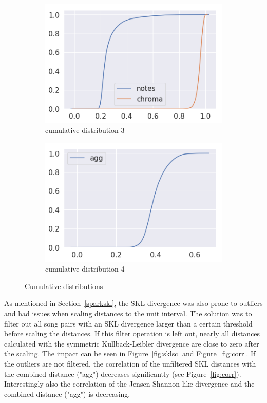 \begin{figure}[htbp]
{{			\begin{subfigure}{.495\textwidth}
				\centering     
				\includegraphics[scale=0.5]{Images/SparkFeat/cum3.png}
				\caption{cumulative distribution 3}
				\label{cum3}
			\end{subfigure}%
			\begin{subfigure}{.495\textwidth}
				\centering    
				\includegraphics[scale=0.5]{Images/SparkFeat/cum4.png}
				\caption{cumulative distribution 4}
				\label{cum4}
			\end{subfigure}	
	}}
	\caption{Cumulative distributions}
	\label{fig:cumdist}
\end{figure}
\FloatBarrier

\noindent As mentioned in Section~\ref{sparkskl}, the SKL divergence was also prone to outliers and had issues when scaling distances to the unit interval. The solution was to filter out all song pairs with an SKL divergence larger than a certain threshold before scaling the distances. If this filter operation is left out, nearly all distances calculated with the symmetric Kullback-Leibler divergence are close to zero after the scaling. The impact can be seen in Figure~\ref{fig:sklsc} and Figure~\ref{fig:corr}.
\noindent If the outliers are not filtered, the correlation of the unfiltered SKL distances with the combined distance ("agg") decreases significantly (see Figure~\ref{fig:corr}). Interestingly also the correlation of the Jensen-Shannon-like divergence and the combined distance ("agg") is decreasing. 

